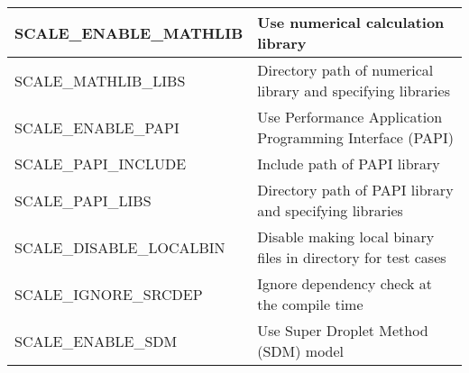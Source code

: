 \begin{table}[htb]
\begin{center}
\begin{tabularx}{150mm}{|l|X|}
 SCALE\_ENABLE\_MATHLIB   & Use numerical calculation library \\ \hline
 SCALE\_MATHLIB\_LIBS     & Directory path of numerical library and specifying libraries \\ \hline
 SCALE\_ENABLE\_PAPI      & Use Performance Application Programming Interface (PAPI) \\ \hline
 SCALE\_PAPI\_INCLUDE     & Include path of PAPI library \\ \hline
 SCALE\_PAPI\_LIBS        & Directory path of PAPI library and specifying libraries \\ \hline
 SCALE\_DISABLE\_LOCALBIN & Disable making local binary files in directory for test cases \\ \hline
 SCALE\_IGNORE\_SRCDEP    & Ignore dependency check at the compile time \\ \hline
 SCALE\_ENABLE\_SDM       & Use Super Droplet Method (SDM) model \\ \hline
\end{tabularx}
\label{tab:env_var_list}
\end{center}
\end{table}



